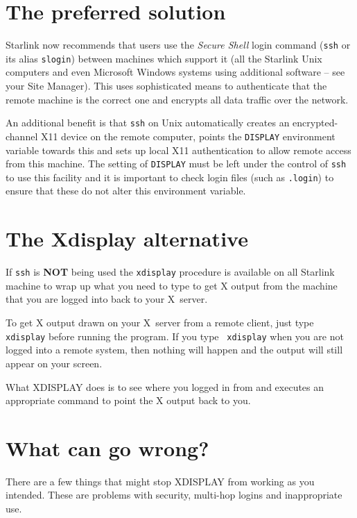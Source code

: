 \documentclass[twoside,11pt]{article}
\newcommand{\xlabel}[1]{}
\renewcommand{\_}{\texttt{\symbol{95}}}
\begin{document}
\section{\label{ssh}\xlabel{ssh} The preferred solution}

Starlink now recommends that users use the \textit{Secure Shell} login
command (\texttt{ssh} or its alias \texttt{slogin}) between machines which
support it (all the Starlink Unix computers and even Microsoft Windows
systems using additional software -- see your Site Manager). This uses
sophisticated means to authenticate that the remote machine is the
correct one and encrypts all data traffic over the network.

An additional benefit is that \texttt{ssh} on Unix automatically creates
an encrypted-channel X11 device on the remote computer, points the
\texttt{DISPLAY} environment variable towards this and sets up local X11
authentication to allow remote access from this machine. The setting of
\texttt{DISPLAY} must be left under the control of \texttt{ssh} to use this
facility and it is important to check login files (such as \texttt{.login})
to ensure that these do not alter this environment variable.

\section{\label{solution}\xlabel{solution}The Xdisplay alternative}

If \texttt{ssh} is \textbf{NOT} being used the \texttt{xdisplay} procedure
is available on all Starlink machine to wrap up what you need to type
to get X output from the machine that you are logged into back to your
X~server.

To get X output drawn on your X~server from a remote client, just type
\texttt{ xdisplay} before running the program.  If you type \texttt{ xdisplay}
when you are not logged into a remote system, then nothing will happen
and the output will still appear on your screen.

What XDISPLAY does is to see where you logged in from and executes an
appropriate command to point the X output back to you.

\section{\label{wrong}\xlabel{wrong}What can go wrong?}

There are a few things that might stop XDISPLAY from working as you intended.
These are problems with security, multi-hop logins and inappropriate use.
\end{document}
